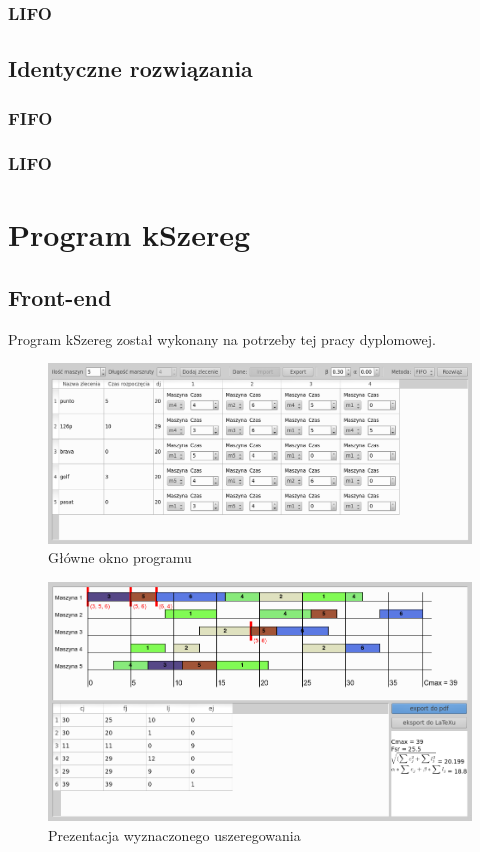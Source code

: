 \documentclass[twoside]{kInzynierka}
\begin{document}
\subsubsection  {LIFO}

\subsection     {Identyczne rozwiązania}
\subsubsection  {FIFO}

\subsubsection  {LIFO}

       
\section        {Program kSzereg}
\subsection     {Front-end}
Program kSzereg został wykonany na potrzeby tej pracy dyplomowej.\\

\begin{figure}[htb]
    \centering
    \includegraphics[width=\textwidth, keepaspectratio=true]{./obrazki/main}
    \caption{Główne okno programu}
\end{figure}

\begin{figure}[htb]
    \centering
    \includegraphics[width=\textwidth, keepaspectratio=true]{./obrazki/wykres}
    \caption{Prezentacja wyznaczonego uszeregowania}
\end{figure}
\end{document}
